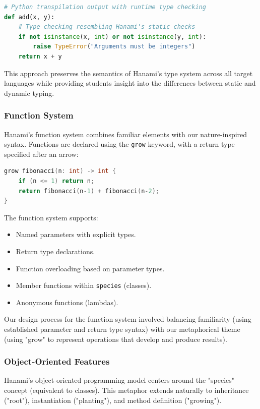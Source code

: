\documentclass[conference]{IEEEtran}
\begin{document}
\begin{lstlisting}[language=Python, caption={Python transpilation output with runtime type checking}, label={lst:python_type_check}]
# Python transpilation output with runtime type checking
def add(x, y):
    # Type checking resembling Hanami's static checks
    if not isinstance(x, int) or not isinstance(y, int):
        raise TypeError("Arguments must be integers")
    return x + y
\end{lstlisting}
This approach preserves the semantics of Hanami's type system across all target languages while providing students insight into the differences between static and dynamic typing.

\subsubsection{Function System}
Hanami's function system combines familiar elements with our nature-inspired syntax. Functions are declared using the \texttt{grow} keyword, with a return type specified after an arrow:

\begin{lstlisting}[language=C++, caption={Hanami Fibonacci function example}, label={lst:fibonacci}]
grow fibonacci(n: int) -> int {
    if (n <= 1) return n;
    return fibonacci(n-1) + fibonacci(n-2);
}
\end{lstlisting}
The function system supports:
\begin{itemize}
    \item Named parameters with explicit types.
    \item Return type declarations.
    \item Function overloading based on parameter types.
    \item Member functions within \texttt{species} (classes).
    \item Anonymous functions (lambdas). %
\end{itemize}
Our design process for the function system involved balancing familiarity (using established parameter and return type syntax) with our metaphorical theme (using "grow" to represent operations that develop and produce results).

\subsubsection{Object-Oriented Features}
Hanami's object-oriented programming model centers around the "species" concept (equivalent to classes). This metaphor extends naturally to inheritance ("root"), instantiation ("planting"), and method definition ("growing").
\end{document}
